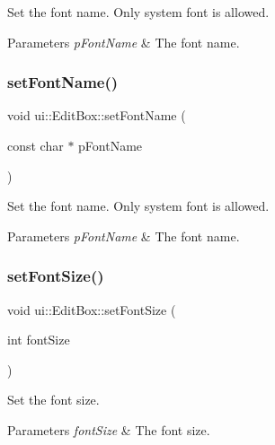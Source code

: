 Set the font name. Only system font is allowed. 
\begin{DoxyParams}{Parameters}
{\em p\+Font\+Name} & The font name. \\
\hline
\end{DoxyParams}
\mbox{\label{classui_1_1EditBox_a1070042cf20467ff429d93285a592204}} 
\subsubsection{\texorpdfstring{set\+Font\+Name()}{setFontName()}\hspace{0.1cm}{\footnotesize\ttfamily [2/2]}}
{\footnotesize\ttfamily void ui\+::\+Edit\+Box\+::set\+Font\+Name (\begin{DoxyParamCaption}\item[{const char $\ast$}]{p\+Font\+Name }\end{DoxyParamCaption})}

Set the font name. Only system font is allowed. 
\begin{DoxyParams}{Parameters}
{\em p\+Font\+Name} & The font name. \\
\hline
\end{DoxyParams}
\mbox{\label{classui_1_1EditBox_a92dda35f7efd5779f63dd70fa7f86686}} 
\subsubsection{\texorpdfstring{set\+Font\+Size()}{setFontSize()}\hspace{0.1cm}{\footnotesize\ttfamily [1/2]}}
{\footnotesize\ttfamily void ui\+::\+Edit\+Box\+::set\+Font\+Size (\begin{DoxyParamCaption}\item[{int}]{font\+Size }\end{DoxyParamCaption})}

Set the font size. 
\begin{DoxyParams}{Parameters}
{\em font\+Size} & The font size. \\
\hline
\end{DoxyParams}
\mbox{\label{classui_1_1EditBox_a92dda35f7efd5779f63dd70fa7f86686}} 
